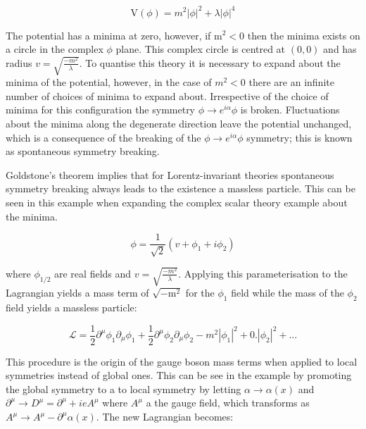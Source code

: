 \begin{equation}
\text{V}(\phi) = m^{2}|\phi|^{2} + \lambda |\phi|^{4}
\end{equation}

The potential has a minima at zero, however, if $\text{m}^{2} < 0$ then the minima exists on a circle in the complex $\phi$ plane.  This complex circle is centred at $(0,0)$ and has radius $v = \sqrt{\frac{-m^{2}}{\lambda}}$.  To quantise this theory it is necessary to expand about the minima of the potential, however, in the case of $m^{2} < 0$ there are an infinite number of choices of minima to expand about.  Irrespective of the choice of minima for this configuration the symmetry $\phi \rightarrow e^{i\alpha} \phi$ is broken.  Fluctuations about the minima along the degenerate direction leave the potential unchanged, which is a consequence of the breaking of the $\phi \rightarrow e^{i\alpha} \phi$ symmetry; this is known as spontaneous symmetry breaking.

Goldstone's theorem \cite{Goldstone:1962es} implies that for Lorentz-invariant theories spontaneous symmetry breaking always leads to the existence a massless particle.  This can be seen in this example when expanding the complex scalar theory example about the minima.

\begin{equation}
\phi = \frac{1}{\sqrt{2}}(v + \phi_{1} + i \phi_{2})
\end{equation}

where $\phi_{1/2}$ are real fields and $v = \sqrt{\frac{-m^{2}}{\lambda}}$.  Applying this parameterisation to the Lagrangian yields a mass term of $\sqrt{-\text{m}^{2}}$ for the $\phi_{1}$ field while the mass of the $\phi_{2}$ field yields a massless particle:

\begin{equation}
\mathcal{L} = \frac{1}{2}\partial^{\mu} \phi_{1} \partial_{\mu} \phi_{1} + \frac{1}{2}\partial^{\mu} \phi_{2} \partial_{\mu} \phi_{2} - m^{2}|\phi_{1}|^{2} + 0.|\phi_{2}|^{2} + ...
\end{equation}

This procedure is the origin of the gauge boson mass terms when applied to local symmetries instead of global ones.  This can be see in the example by promoting the global symmetry to a to local symmetry by letting $\alpha \rightarrow \alpha(x)$ and $\partial^{\mu} \rightarrow D^{\mu} = \partial^{\mu} + ieA^{\mu}$ where $A^{\mu}$ a the gauge field, which transforms as $A^{\mu} \rightarrow A^{\mu} - \partial^{\mu}\alpha(x)$.  The new Lagrangian becomes:


